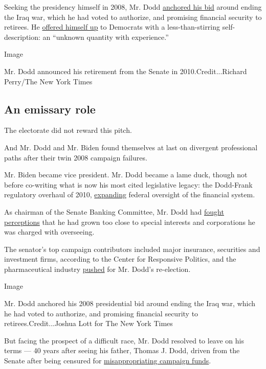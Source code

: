 Seeking the presidency himself in 2008, Mr. Dodd
\href{https://www.nytimes.com/2007/09/24/us/politics/24dodd.html}{anchored
his bid} around ending the Iraq war, which he had voted to authorize,
and promising financial security to retirees. He
\href{https://www.nytimes.com/2007/01/12/us/politics/12dodd.html}{offered
himself up} to Democrats with a less-than-stirring self-description: an
``unknown quantity with experience.''

Image

Mr. Dodd announced his retirement from the Senate in
2010.Credit...Richard Perry/The New York Times

\hypertarget{an-emissary-role}{%
\subsection{An emissary role}\label{an-emissary-role}}

The electorate did not reward this pitch.

And Mr. Dodd and Mr. Biden found themselves at last on divergent
professional paths after their twin 2008 campaign failures.

Mr. Biden became vice president. Mr. Dodd became a lame duck, though not
before co-writing what is now his most cited legislative legacy: the
Dodd-Frank regulatory overhaul of 2010,
\href{https://www.nytimes.com/2010/07/16/business/16regulate.html}{expanding}
federal oversight of the financial system.

As chairman of the Senate Banking Committee, Mr. Dodd had
\href{https://www.nytimes.com/2009/03/20/nyregion/20dodd.html}{fought
perceptions} that he had grown too close to special interests and
corporations he was charged with overseeing.

The senator's top campaign contributors included major insurance,
securities and investment firms, according to the Center for Responsive
Politics, and the pharmaceutical industry
\href{https://www.nytimes.com/2009/07/28/us/politics/28dodd.html}{pushed}
for Mr. Dodd's re-election.

Image

Mr. Dodd anchored his 2008 presidential bid around ending the Iraq war,
which he had voted to authorize, and promising financial security to
retirees.Credit...Joshua Lott for The New York Times

But facing the prospect of a difficult race, Mr. Dodd resolved to leave
on his terms --- 40 years after seeing his father, Thomas J. Dodd,
driven from the Senate after being censured for
\href{https://www.nytimes.com/1971/05/25/archives/exsenator-dodd-is-dead-at-64-censured-in-1967-by-colleagues.html}{misappropriating
campaign funds}.

